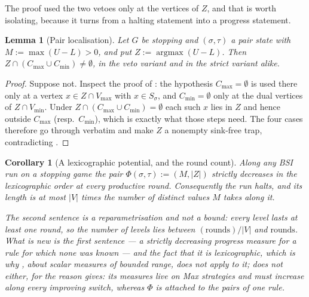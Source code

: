 \documentclass[11pt]{article}
\theoremstyle{plain}
\newtheorem{lemma}[theorem]{Lemma}
\newtheorem{corollary}[theorem]{Corollary}
\theoremstyle{definition}
\newcommand{\Vmax}{V_{\max}}
\newcommand{\Vmin}{V_{\min}}
\begin{document}
The proof used the two vetoes only at the vertices of $Z$, and that is worth
isolating, because it turns  from a halting statement
into a progress statement.

\begin{lemma}[Pair localisation]\label{lem:bsi-pairloc}
Let $G$ be stopping and $(\sigma,\tau)$ a pair state with
$M:=\max(U-L)>0$, and put $Z:=\operatorname{argmax}(U-L)$. Then
$Z\cap(C_{\max}\cup C_{\min})\ne\emptyset$, in the veto variant and in the
strict variant alike.
\end{lemma}

\begin{proof}
Suppose not. Inspect the proof of : the hypothesis
$C_{\max}=\emptyset$ is used there only at a vertex $x\in Z\cap\Vmax$ with
$x\in S_\sigma$, and $C_{\min}=\emptyset$ only at the dual vertices of
$Z\cap\Vmin$. Under $Z\cap(C_{\max}\cup C_{\min})=\emptyset$ each such $x$
lies in $Z$ and hence outside $C_{\max}$ (resp.\ $C_{\min}$), which is
exactly what those steps need. The four cases therefore go through
verbatim and make $Z$ a nonempty sink-free trap, contradicting
.
\end{proof}

\begin{corollary}[A lexicographic potential, and the round count]\label{cor:bsi-levels}
Along any BSI run on a stopping game the pair
$\Phi(\sigma,\tau):=(M,|Z|)$ strictly decreases in the lexicographic order
at every productive round. Consequently the run halts, and its length is
at most $|V|$ times the number of distinct values $M$ takes along it.

The second sentence is a reparametrisation and not a bound: every level
lasts at least one round, so the number of levels lies between
$(\text{rounds})/|V|$ and $\text{rounds}$. What is new is the first
sentence --- a strictly decreasing progress measure for a rule for which
none was known --- and the fact that it is \emph{lexicographic}, which is
why , about scalar measures of bounded range, does
not apply to it;  does not either, for the reason
 gives: its measures live on Max strategies and must
increase along \emph{every} improving switch, whereas $\Phi$ is attached
to the pairs of one rule.
\end{corollary}
\end{document}
